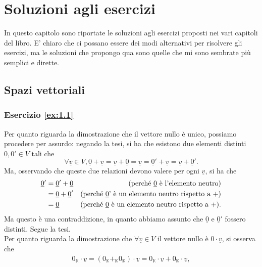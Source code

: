 \chapter{Soluzioni agli esercizi}

In questo capitolo sono riportate le soluzioni agli esercizi proposti nei vari capitoli del libro. E' chiaro che ci possano essere dei modi alternativi per risolvere gli esercizi, ma le soluzioni che propongo qua sono quelle che mi sono sembrate più semplici e dirette.

\section{Spazi vettoriali}
\subsection*{Esercizio \ref{ex:1.1}}
Per quanto riguarda la dimostrazione che il vettore nullo è unico, possiamo procedere per assurdo: negando la tesi, si ha che esistono due elementi distinti $\underline{0}, \underline{0}' \in V$ tali che
    $$
    \forall \underline{v} \in V, \underline{0} + \underline{v} = \underline{v} + \underline{0} = \underline{v} = \underline{0}' + \underline{v} = \underline{v} + \underline{0}'.
    $$
    Ma, osservando che queste due relazioni devono valere per ogni $\underline{v}$, si ha che
    \begin{align}
\underline{0}' &= \underline{0}' + \underline{0} & \text{(perché \underline{0} è l'elemento neutro)} \\
&= \underline{0} + \underline{0}' & \text{(perché \underline{0}' è un elemento neutro rispetto a $+$)} \\
&= \underline{0} & \text{(perché \underline{0} è un elemento neutro rispetto a $+$)}.
\end{align}
Ma questo è una contraddizione, in quanto abbiamo assunto che $\underline{0}$ e $\underline{0}'$ fossero distinti. Segue la tesi. \\
Per quanto riguarda la dimostrazione che $\forall \underline{v} \in V$ il vettore nullo è $0 \cdot \underline{v}$, si osserva che
\begin{align}
    0_\mathbb{K} \cdot \underline{v} = (0_\mathbb{K} +_{\mathbb{K}} 0_\mathbb{K}) \cdot \underline{v} = 0_{\mathbb{K}} \cdot \underline{v} + 0_\mathbb{K} \cdot \underline{v}, 
    \end{align}
